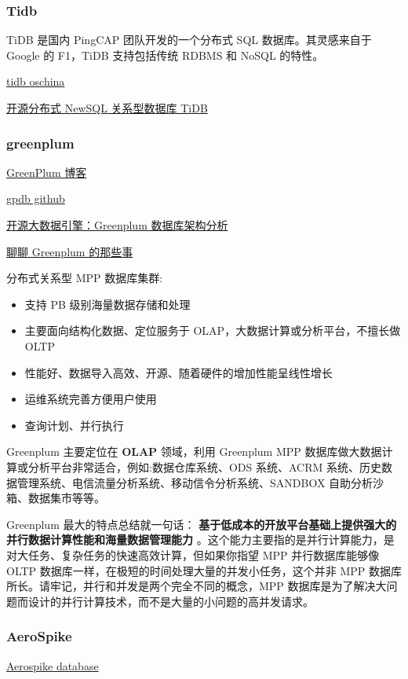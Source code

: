 \documentclass[hyperref, UTF-8]{ctexart}
\begin{document}
\subsubsection{Tidb}
\label{sec:orgba86068}
TiDB 是国内 PingCAP 团队开发的一个分布式 SQL 数据库。其灵感来自于 Google 的 F1，TiDB 支持包括传统 RDBMS 和 NoSQL 的特性。  

\href{https://gitee.com/ngaut/tidb}{tidb oschina}  

\href{https://oschina.net/p/tidb}{开源分布式 NewSQL 关系型数据库 TiDB}
\subsubsection{greenplum}
\label{sec:org4cc658b}
\href{http://blog.csdn.net/zx8167107/article/details/78574755}{GreenPlum 博客}   

\href{https://github.com/greenplum-db/gpdb}{gpdb github}   

\href{http://geek.csdn.net/news/detail/49960}{开源大数据引擎：Greenplum 数据库架构分析}   

\href{http://dbaplus.cn/news-21-341-1.html}{聊聊 Greenplum 的那些事}   

分布式关系型 MPP 数据库集群:
\begin{itemize}
\item 支持 PB 级别海量数据存储和处理
\item 主要面向结构化数据、定位服务于 OLAP，大数据计算或分析平台，不擅长做 OLTP
\item 性能好、数据导入高效、开源、随着硬件的增加性能呈线性增长
\item 运维系统完善方便用户使用
\item 查询计划、并行执行
\end{itemize}
Greenplum 主要定位在 \textbf{OLAP} 领域，利用 Greenplum MPP 数据库做大数据计算或分析平台非常适合，例如:数据仓库系统、ODS 系统、ACRM 系统、历史数据管理系统、电信流量分析系统、移动信令分析系统、SANDBOX 自助分析沙箱、数据集市等等。

Greenplum 最大的特点总结就一句话： \textbf{基于低成本的开放平台基础上提供强大的并行数据计算性能和海量数据管理能力} 。这个能力主要指的是并行计算能力，是对大任务、复杂任务的快速高效计算，但如果你指望 MPP 并行数据库能够像 OLTP 数据库一样，在极短的时间处理大量的并发小任务，这个并非 MPP 数据库所长。请牢记，并行和并发是两个完全不同的概念，MPP 数据库是为了解决大问题而设计的并行计算技术，而不是大量的小问题的高并发请求。
\subsubsection{AeroSpike}
\label{sec:org4d81217}
\href{https://en.wikipedia.org/wiki/Aerospike\_database}{Aerospike database}  
\end{document}
